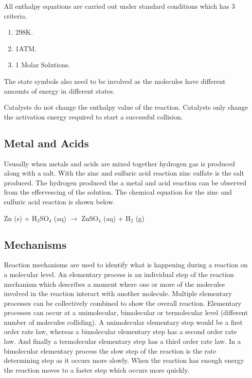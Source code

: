 All enthalpy equations are carried out under standard conditions which has 3 criteria.

\begin{enumerate}
\item 298K.
\item 1ATM.
\item 1 Molar Solutions.
\end{enumerate}

The state symbols also need to be involved as the molecules have different amounts of energy in different states. 

Catalysts do not change the enthalpy value of the reaction. Catalysts only change the activation energy required to start a successful collision.




	
	


	\subsection{Metal and Acids}

Ususally when metals and acids are mixed together hydrogen gas is produced along with a salt. With the zinc and sulfuric acid reaction zinc sulfate is the salt produced. The hydrogen produced the a metal and acid reaction can be observed from the effervescing of the solution. The chemical equation for the zinc and sulfuric acid reaction is shown below.

Zn (s) + H$_2$SO$_4$ (aq) $\rightarrow$ ZnSO$_4$ (aq) + H$_2$ (g)




	\subsection{Mechanisms}

Reaction mechanisms are used to identify what is happening during a reaction on a molecular level. An elementary process is an individual step of the reaction mechanism which describes a moment where one or more of the molecules involved in the reaction interact with another molecule. Multiple elementary processes can be collectively combined to show the overall reaction. Elementary processes can occur at a unimolecular, bimolecular or termolecular level (different number of molecules colliding). A unimolecular elementary step would be a first order rate law, whereas a bimolecular elementary step has a second order rate law. And finally a termolecular elementary step has a third order rate law. In a bimolecular elementary process the slow step of the reaction is the rate determining step as it occurs more slowly. When the reaction has enough energy the reaction moves to a faster step which occurs more quickly.

